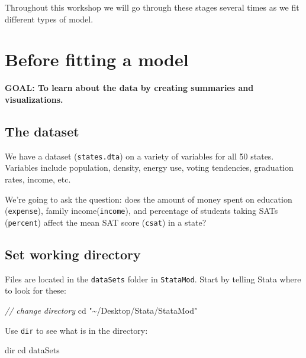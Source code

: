 \documentclass[
]{book}
\newenvironment{Shaded}{\begin{snugshade}}{\end{snugshade}}
\newcommand{\CommentTok}[1]{\textcolor[rgb]{0.56,0.35,0.01}{\textit{#1}}}
\newcommand{\NormalTok}[1]{#1}
\newcommand{\OtherTok}[1]{\textcolor[rgb]{0.56,0.35,0.01}{#1}}
\newcommand{\StringTok}[1]{\textcolor[rgb]{0.31,0.60,0.02}{#1}}
\begin{document}
Throughout this workshop we will go through these stages several times as we fit different types of model.

\hypertarget{before-fitting-a-model-1}{%
\section{Before fitting a model}\label{before-fitting-a-model-1}}

\begin{alert}

\textbf{GOAL: To learn about the data by creating summaries and visualizations.}

\end{alert}

\hypertarget{the-dataset}{%
\subsection{The dataset}\label{the-dataset}}

We have a dataset (\texttt{states.dta}) on a variety of variables for all 50 states. Variables include population, density, energy use, voting tendencies, graduation rates, income, etc.

We're going to ask the question: does the amount of money spent on education (\texttt{expense}), family income(\texttt{income}), and percentage of students taking SATs (\texttt{percent}) affect the mean SAT score (\texttt{csat}) in a state?

\hypertarget{set-working-directory}{%
\subsection{Set working directory}\label{set-working-directory}}

Files are located in the \texttt{dataSets} folder in \texttt{StataMod}. Start by telling Stata where to look for these:

\begin{Shaded}
\begin{Highlighting}[]
\CommentTok{// change directory}
\NormalTok{cd }\StringTok{"\textasciitilde{}/Desktop/Stata/StataMod"}
\end{Highlighting}
\end{Shaded}

Use \texttt{dir} to see what is in the directory:

\begin{Shaded}
\begin{Highlighting}[]
\OtherTok{dir}
\NormalTok{cd dataSets}
\end{Highlighting}
\end{Shaded}
\end{document}
